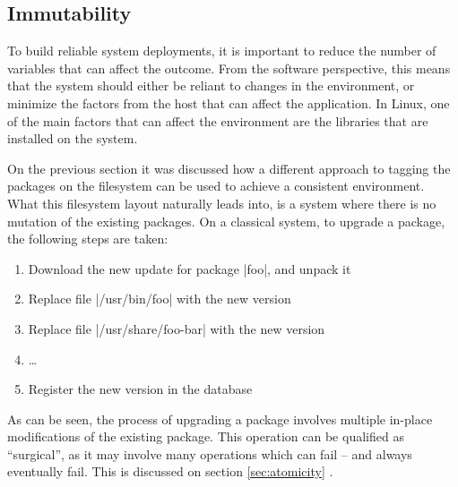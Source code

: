 \FloatBarrier
\subsection{Immutability}

To build reliable system deployments, it is important to reduce the
number of variables that can affect the outcome. From the
software perspective, this means that the system should
either be reliant to changes in the environment, or minimize
the factors from the host that can affect the application.
In Linux, one of the main factors that can affect the
environment are the libraries that are installed on the
system.

On the previous section it was discussed how a different
approach to tagging the packages on the filesystem can be
used to achieve a consistent environment. What this
filesystem layout naturally leads into, is a system where
there is no mutation of the existing packages. On a
classical system, to upgrade a package, the following steps
are taken:

\begin{enumerate}
    \item Download the new update for package |foo|, and unpack it
    \item Replace file |/usr/bin/foo| with the new version
    \item Replace file |/usr/share/foo-bar| with the new version
    \item \ldots
    \item Register the new version in the database
\end{enumerate}

As can be seen, the process of upgrading a package involves
multiple in-place modifications of the existing package.
This operation can be qualified as ``surgical'', as it may
involve many operations which can fail -- and always
eventually fail. This is discussed on section
\ref{sec:atomicity} .

